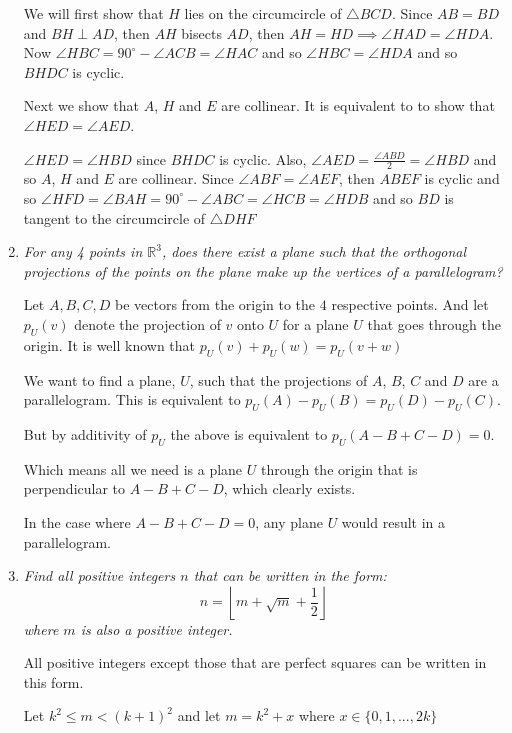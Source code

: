 \documentclass{article}
\begin{document}
\begin{enumerate}
We will first show that $H$ lies on the circumcircle of $\triangle BCD$.
Since $AB = BD$ and $BH \perp AD$, then $AH$ bisects $AD$, then $AH = HD \implies \angle HAD = \angle HDA$. Now $\angle HBC = 90^{\circ} - \angle ACB = \angle HAC$ and so $\angle HBC = \angle HDA$ and so $BHDC$ is cyclic. 

Next we show that $A$, $H$ and $E$ are collinear.
It is equivalent to to show that $\angle HED = \angle AED$. 

$\angle HED = \angle HBD$ since $BHDC$ is cyclic. 
Also, $\angle AED = \frac{\angle ABD}{2} = \angle HBD$ and so $A$, $H$ and $E$ are collinear. 
Since $\angle ABF = \angle AEF$, then $ABEF$ is cyclic and so $\angle HFD = \angle BAH = 90^{\circ} - \angle ABC = \angle HCB = \angle HDB$ and so $BD$ is tangent to the circumcircle of $\triangle DHF$


\medskip
\item %
{\itshape For any 4 points in $\mathbb{R}^3$, does there exist a plane such that the orthogonal projections of the points on the plane make up the vertices of a parallelogram?

}
Let $A,B,C,D$ be vectors from the origin to the $4$ respective points.
And let $p_U(v)$ denote the projection of $v$ onto $U$ for a plane $U$ that goes through the origin. It is well known that $p_U(v) + p_U(w) = p_U(v + w)$

We want to find a plane, $U$, such that the projections of $A$, $B$, $C$ and $D$ are a parallelogram. This is equivalent to
$p_U(A) - p_U(B) = p_U(D) - p_U(C)$.

But by additivity of $p_U$ the above is equivalent to
$p_U(A - B + C - D) = 0$.

Which means all we need is a plane $U$ through the origin that is perpendicular to $A - B + C - D$, which clearly exists.

In the case where $A - B + C - D = 0$, any plane $U$ would result in a parallelogram.


\medskip
\item %
{\itshape Find all positive integers $n$ that can be written in the form:
$$n = \left\lfloor m + \sqrt{m} + \frac{1}{2} \right\rfloor$$
where $m$ is also a positive integer.}

All positive integers except those that are perfect squares can be written in this form. 

Let $k^{2} \leq m < (k+1)^{2}$ and let $m = k^{2} + x$ where $x \in \{0,1,...,2k\}$


\end{enumerate}
\end{document}
